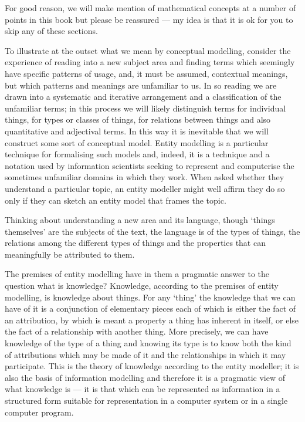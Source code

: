 For good reason, we will make mention of mathematical concepts at a number of points in this book
but please be reassured --- my idea is that it is ok for you to skip any of these sections. 

To illustrate at the outset what we mean by conceptual modelling, consider the experience of reading into a new subject area and finding terms which seemingly have specific patterns of usage, and, it must be assumed, contextual meanings, but which patterns and meanings are unfamiliar to us. In so reading we are drawn into a systematic and iterative arrangement and a classification of the unfamiliar terms; in this process we will likely distinguish terms for individual things, for types or classes of things, for relations between things and also quantitative and adjectival terms. In this way it is inevitable that we will construct some sort of conceptual model. 
Entity modelling is a particular technique for formalising such models and, indeed, it is a technique and a notation used by information scientists seeking to represent and computerise the sometimes unfamiliar domains in which they work. When asked whether they understand a particular topic, an entity modeller might well affirm they do so only if they can sketch an entity model that frames the topic.

Thinking about understanding a new area and its language, though ‘things themselves’ are the subjects of the text, the language is of the types of things, the relations among the different types of things and the properties that can meaningfully be attributed to them. 

The premises of entity modelling have in them a pragmatic answer to the question what is knowledge? Knowledge, according to the premises of entity modelling, is knowledge about things. For any ‘thing’ the knowledge that we can have of it is a conjunction of elementary pieces each of which is either the fact of an attribution, by which is meant a property a thing has inherent in itself, or else the fact of a relationship with another thing. More precisely, we can have knowledge of the type of a thing and knowing its type is to know both the kind of attributions which may be made of it and the relationships in which it may participate. This is the theory of knowledge according to the entity modeller; it is also the basis of information modelling and therefore it is a pragmatic view of what knowledge is — it is that which can be represented as information in a structured form suitable for representation in a computer system or in a single computer program.

